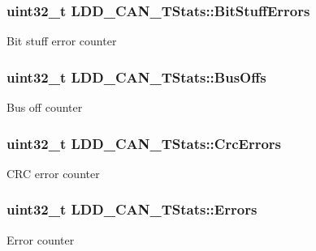 \subsubsection[{\texorpdfstring{Bit\+Stuff\+Errors}{BitStuffErrors}}]{\setlength{\rightskip}{0pt plus 5cm}uint32\+\_\+t L\+D\+D\+\_\+\+C\+A\+N\+\_\+\+T\+Stats\+::\+Bit\+Stuff\+Errors}\hypertarget{struct_l_d_d___c_a_n___t_stats_a811a427adbc75325167b5073963c676a}{}\label{struct_l_d_d___c_a_n___t_stats_a811a427adbc75325167b5073963c676a}
Bit stuff error counter 
\subsubsection[{\texorpdfstring{Bus\+Offs}{BusOffs}}]{\setlength{\rightskip}{0pt plus 5cm}uint32\+\_\+t L\+D\+D\+\_\+\+C\+A\+N\+\_\+\+T\+Stats\+::\+Bus\+Offs}\hypertarget{struct_l_d_d___c_a_n___t_stats_aa01ae74140765599c87675e5df7d8a3d}{}\label{struct_l_d_d___c_a_n___t_stats_aa01ae74140765599c87675e5df7d8a3d}
Bus off counter 
\subsubsection[{\texorpdfstring{Crc\+Errors}{CrcErrors}}]{\setlength{\rightskip}{0pt plus 5cm}uint32\+\_\+t L\+D\+D\+\_\+\+C\+A\+N\+\_\+\+T\+Stats\+::\+Crc\+Errors}\hypertarget{struct_l_d_d___c_a_n___t_stats_a27e16f4ddc9cdf544026c4d6ce7b698f}{}\label{struct_l_d_d___c_a_n___t_stats_a27e16f4ddc9cdf544026c4d6ce7b698f}
C\+RC error counter 
\subsubsection[{\texorpdfstring{Errors}{Errors}}]{\setlength{\rightskip}{0pt plus 5cm}uint32\+\_\+t L\+D\+D\+\_\+\+C\+A\+N\+\_\+\+T\+Stats\+::\+Errors}\hypertarget{struct_l_d_d___c_a_n___t_stats_a9540270ab882bd0afa615b87afb9e6b3}{}\label{struct_l_d_d___c_a_n___t_stats_a9540270ab882bd0afa615b87afb9e6b3}
Error counter 
